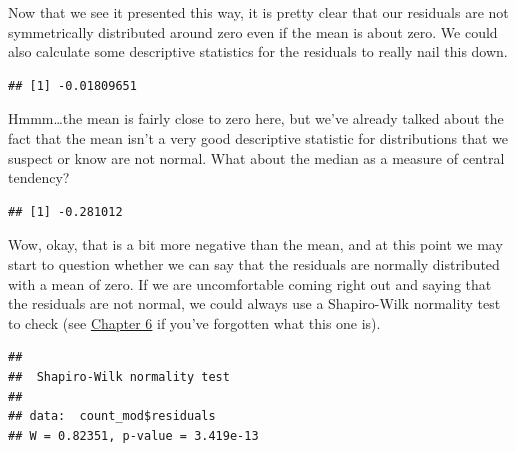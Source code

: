 \documentclass[
]{book}
\newenvironment{Shaded}{\begin{snugshade}}{\end{snugshade}}
\newcommand{\KeywordTok}[1]{\textcolor[rgb]{0.13,0.29,0.53}{\textbf{#1}}}
\newcommand{\NormalTok}[1]{#1}
\newcommand{\OperatorTok}[1]{\textcolor[rgb]{0.81,0.36,0.00}{\textbf{#1}}}
\begin{document}
Now that we see it presented this way, it is pretty clear that our residuals are not symmetrically distributed around zero even if the mean is about zero. We could also calculate some descriptive statistics for the residuals to really nail this down.

\begin{Shaded}
\end{Shaded}

\begin{verbatim}
## [1] -0.01809651
\end{verbatim}

Hmmm\ldots the mean is fairly close to zero here, but we've already talked about the fact that the mean isn't a very good descriptive statistic for distributions that we suspect or know are not normal. What about the median as a measure of central tendency?

\begin{Shaded}
\end{Shaded}

\begin{verbatim}
## [1] -0.281012
\end{verbatim}

Wow, okay, that is a bit more negative than the mean, and at this point we may start to question whether we can say that the residuals are normally distributed with a mean of zero. If we are uncomfortable coming right out and saying that the residuals are not normal, we could always use a Shapiro-Wilk normality test to check (see \protect\hyperlink{Chapter6}{Chapter 6} if you've forgotten what this one is).

\begin{Shaded}
\end{Shaded}

\begin{verbatim}
## 
## 	Shapiro-Wilk normality test
## 
## data:  count_mod$residuals
## W = 0.82351, p-value = 3.419e-13
\end{verbatim}
\end{document}
